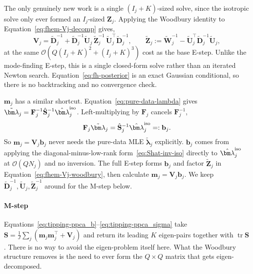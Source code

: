The only genuinely new work is a single $(I_j+K)$-sized solve, since the isotropic solve only ever formed an
$I_j$-sized $\mathbf Z_j$. Applying the Woodbury identity to Equation~\eqref{eq:fhem-Vj-decomp} gives,
\begin{equation}
    \mathbf V_j=\tilde{\mathbf D}_j^{-1}+\tilde{\mathbf D}_j^{-1}\tilde{\mathbf U}_j\,
    \tilde{\mathbf Z}_j^{-1}\,\tilde{\mathbf U}_j^\top\tilde{\mathbf D}_j^{-1},
    \qquad
    \tilde{\mathbf Z}_j:=\tilde{\mathbf W}_j^{-1}-\tilde{\mathbf U}_j^\top\tilde{\mathbf D}_j^{-1}\tilde{\mathbf U}_j,
    \label{eq:fhem-Vj-woodbury}
\end{equation}
at the same $\mathcal O(Q(I_j+K)^2+(I_j+K)^3)$ cost as the base E-step. Unlike the mode-finding E-step, this is a
single closed-form solve rather than an iterated Newton search. Equation~\eqref{eq:fh-posterior} is an exact Gaussian conditional, so there is no backtracking and no convergence check.

$\mathbf m_j$ has a similar shortcut. Equation~\eqref{eq:pure-data-lambda} gives $\tilde{\bm\lambda}_j=\mathbf F_j^{-1}\hat{\mathbf S}_j^{-1}\hat{\bm\lambda}_j^{\rm iso}$. Left-multiplying by $\mathbf F_j$ cancels $\mathbf F_j^{-1}$,
\begin{equation}
    \mathbf F_j\tilde{\bm\lambda}_j=\hat{\mathbf S}_j^{-1}\hat{\bm\lambda}_j^{\rm iso}=:\mathbf b_j.
    \label{eq:fhem-bj}
\end{equation}
So $\mathbf m_j=\mathbf V_j\mathbf b_j$ never needs the pure-data MLE $\tilde{\bm\lambda}_j$ explicitly. $\mathbf b_j$ comes from applying the diagonal-minus-low-rank form~\eqref{eq:Shat-inv-iso} directly to $\hat{\bm\lambda}_j^{\rm iso}$ at $\mathcal O(QN_j)$ and no inversion. The full E-step forms $\mathbf b_j$ and factor $\tilde{\mathbf Z}_j$ in
Equation~\eqref{eq:fhem-Vj-woodbury}, then calculate $\mathbf m_j=\mathbf V_j\mathbf b_j$. We keep
$\tilde{\mathbf D}_j^{-1},\tilde{\mathbf U}_j,\tilde{\mathbf Z}_j^{-1}$ around for the M-step below.

\paragraph*{M-step}

Equations~\eqref{eq:tipping-ppca_b}--\eqref{eq:tipping-ppca_sigma} take
$\mathbf S=\frac1J\sum_j(\mathbf m_j\mathbf m_j^\top+\mathbf V_j)$ and return its leading $K$ eigen-pairs together with $\operatorname{tr}\mathbf S$. There is no way to avoid the eigen-problem itself here. What the Woodbury structure removes is the need to ever form the $Q\times Q$ matrix that gets eigen-decomposed.

